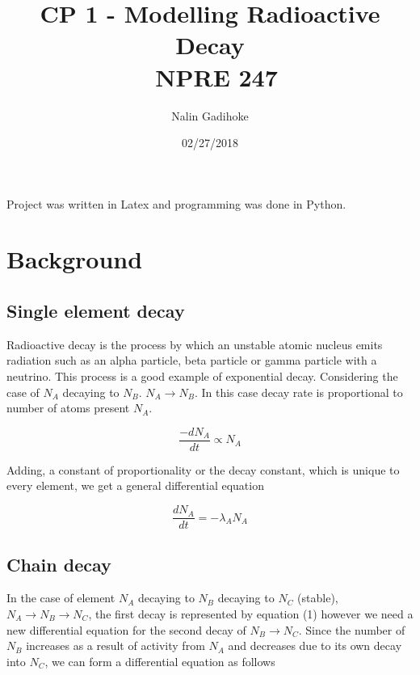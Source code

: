 \documentclass[11pt, oneside]{article}   	%
\title{CP 1 - Modelling Radioactive Decay \\
\ NPRE 247}
\author{Nalin Gadihoke}
\date{02/27/2018}							%
\begin{document}
\maketitle
\thispagestyle{empty}


\clearpage


\tableofcontents{}
\thispagestyle{empty}
\clearpage
{}
Project was written in Latex and programming was done in Python.
\section{Background}
\subsection{Single element decay}
Radioactive decay is the process by which an unstable atomic nucleus emits radiation such as an alpha particle, beta particle or gamma particle with a neutrino. This process is a good example of exponential decay. Considering the case of $N_A$ decaying to $N_B$. $N_A \rightarrow N_B$. In this case decay rate is proportional to number of atoms present $N_A$.

$$ \frac{-dN_A}{dt} \propto N_A $$

Adding, a constant of proportionality or the decay constant, which is unique to every element, we get a general differential equation 	

\begin{equation}
\frac{dN_A}{dt}  = - \lambda_A N_A
\end{equation}

\subsection{Chain decay}
In the case of element $N_A$ decaying to $N_B$ decaying to $N_C$ (stable), $N_A \rightarrow N_B \rightarrow N_C$, the first decay is represented by equation (1) however we need a new differential equation for the second decay of $N_B \rightarrow N_C$. Since the number of $N_B$ increases as a result of activity from $N_A$ and decreases due to its own decay into $N_C$, we can form a differential equation as follows 
\end{document}
